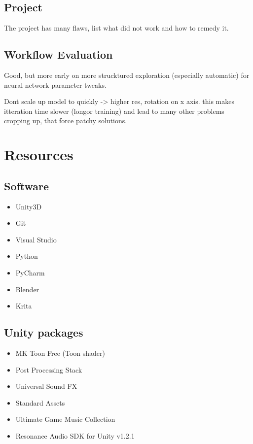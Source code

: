 \documentclass[a4paper, twoside, 10pt]{report}
\begin{document}
\section{Project}
The project has many flaws, list what did not work and how to remedy it.

\section{Workflow Evaluation}
Good, but more early on more strucktured exploration (especially automatic) for neural network parameter tweaks.

Dont scale up model to quickly -> higher res, rotation on x axis. this makes itteration time slower (longor training) and lead to many other problems cropping up, that force patchy solutions.





\chapter{Resources}
\section{Software}
\begin{itemize}
\item Unity3D
\item Git
\item Visual Studio
\item Python
\item PyCharm
\item Blender
\item Krita
\end{itemize}

\section{Unity packages}
\begin{itemize}
\item MK Toon Free (Toon shader) %
\item Post Processing Stack %
\item Universal Sound FX %
\item Standard Assets %
\item Ultimate Game Music Collection %
\item Resonance Audio SDK for Unity v1.2.1 %
\end{itemize}
\end{document}
